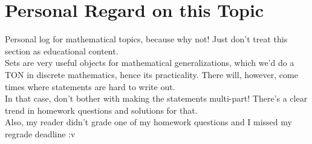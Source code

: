 \section{Personal Regard on this Topic}
Personal log for mathematical topics, because why not! Just don't treat this section as educational content. \\
Sets are very useful objects for mathematical generalizations, which we'd do a TON in discrete mathematics, hence its practicality. There will, however, come times where statements are hard to write out. \\
In that case, don't bother with making the statements multi-part! There's a clear trend in homework questions and solutions for that. \\

Also, my reader didn't grade one of my homework questions and I missed my regrade deadline :v
